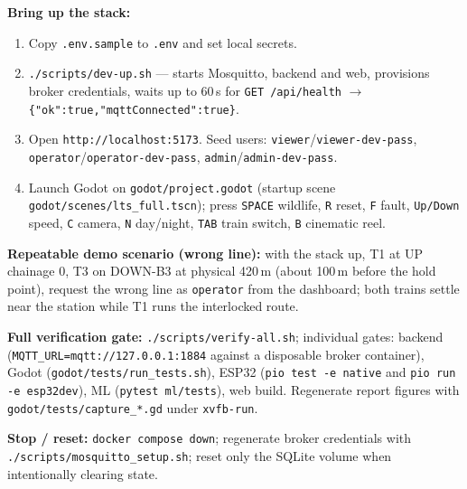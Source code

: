 \textbf{Bring up the stack:}
\begin{enumerate}
  \item Copy \texttt{.env.sample} to \texttt{.env} and set local secrets.
  \item \texttt{./scripts/dev-up.sh} --- starts Mosquitto, backend and
        web, provisions broker credentials, waits up to 60\,s for
        \texttt{GET /api/health} $\rightarrow$
        \texttt{\{"ok":true,"mqttConnected":true\}}.
  \item Open \texttt{http://localhost:5173}. Seed users:
        \texttt{viewer}/\texttt{viewer-dev-pass},
        \texttt{operator}/\texttt{operator-dev-pass},
        \texttt{admin}/\texttt{admin-dev-pass}.
  \item Launch Godot on \texttt{godot/project.godot} (startup scene
        \texttt{godot/scenes/lts\_full.tscn}); press \texttt{SPACE}
        wildlife, \texttt{R} reset, \texttt{F} fault, \texttt{Up/Down}
        speed, \texttt{C} camera, \texttt{N} day/night, \texttt{TAB}
        train switch, \texttt{B} cinematic reel.
\end{enumerate}

\textbf{Repeatable demo scenario (wrong line):} with the stack up, T1 at
UP chainage 0, T3 on DOWN-B3 at physical 420\,m (about 100\,m before the
hold point), request the wrong line as \texttt{operator} from the
dashboard; both trains settle near the station while T1 runs the
interlocked route.

\textbf{Full verification gate:} \texttt{./scripts/verify-all.sh};
individual gates: backend
(\texttt{MQTT\_URL=mqtt://127.0.0.1:1884} against a disposable broker
container), Godot (\texttt{godot/tests/run\_tests.sh}), ESP32
(\texttt{pio test -e native} and \texttt{pio run -e esp32dev}), ML
(\texttt{pytest ml/tests}), web build. Regenerate report figures with
\texttt{godot/tests/capture\_*.gd} under \texttt{xvfb-run}.

\textbf{Stop / reset:} \texttt{docker compose down}; regenerate broker
credentials with \texttt{./scripts/mosquitto\_setup.sh}; reset only the
SQLite volume when intentionally clearing state.
